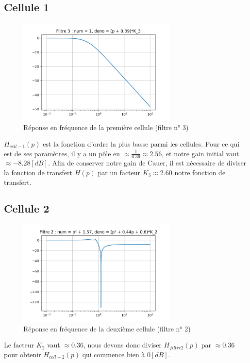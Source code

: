 \documentclass[a4paper,12pt,oneside]{report}	%
\begin{document}
        \subsection{Cellule 1}
            \begin{figure}[h!]
                \centering
                \includegraphics[width = 8cm]{code-projet-python/2.0.4 - Filtre 3.png}
                \caption{Réponse en fréquence de la première cellule (filtre n° 3)}
                \label{fig:repfreq-filtre-3}
            \end{figure}
            $H_{cell-1}(p)$ est la fonction d'ordre la plus basse parmi les cellules. Pour ce qui est de ses paramètres, il y a un pôle en $\approx \frac{1}{0.39} \approx 2.56$, et notre gain initial vaut $\approx -8.28 [dB]$. Afin de conserver notre gain de Cauer, il est nécessaire de diviser la fonction de transfert $H(p)$ par un facteur $K_3 \approx 2.60$ notre fonction de transfert.
        \subsection{Cellule 2}
            \begin{figure}[h!]
                \centering
                \includegraphics[width = 8cm]{code-projet-python/2.0.4 - Filtre 2.png}
                \caption{Réponse en fréquence de la deuxième cellule (filtre n° 2)}
                \label{fig:repfreq-filtre-2}
            \end{figure}
            Le facteur $K_2$ vaut $\approx 0.36$, nous devons donc diviser $H_{filtre 2}(p)$ par $\approx 0.36$ pour obtenir $H_{cell-2}(p)$ qui commence bien à $0 [dB]$.
            
\end{document}
